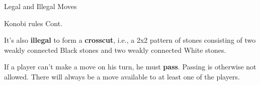 \documentclass{beamer}
\begin{document}
  \begin{frame}{Legal and Illegal Moves}

    \begin{figure}
      \centering
    \end{figure}

  \end{frame}



  \begin{frame}{Konobi rules Cont.}

    It's also \textbf{illegal} to form a \textbf{crosscut}, i.e., a 2x2 pattern of stones consisting of two weakly connected Black stones and two weakly connected White stones.

    \vspace{1em}

    \begin{figure}
    \end{figure}


    If a player can't make a move on his turn, he must \textbf{pass}. Passing is otherwise not allowed. There will always be a move available to at least one of the players.

  \end{frame}
\end{document}
